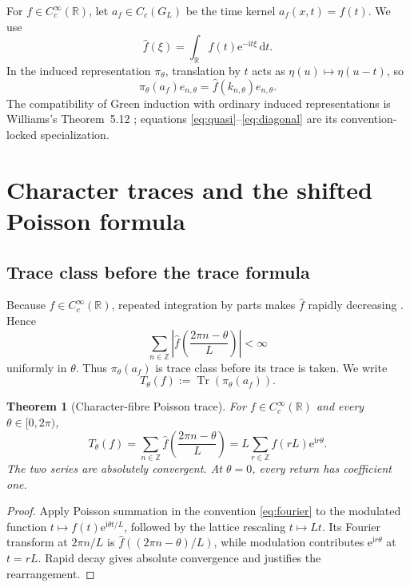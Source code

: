 \documentclass[11pt]{article}
\newtheorem{theorem}{Theorem}[section]
\theoremstyle{definition}
\newcommand{\R}{\mathbb{R}}
\newcommand{\Z}{\mathbb{Z}}
\newcommand{\dd}{\,\mathrm{d}}
\newcommand{\e}{\mathrm{e}}
\newcommand{\ii}{\mathrm{i}}
\newcommand{\Tr}{\operatorname{Tr}}
\begin{document}
For \(f\in C_c^\infty(\R)\), let \(a_f\in C_c(G_L)\) be the time kernel \(a_f(x,t)=f(t)\).  We use
\begin{equation}
 \widehat f(\xi)=\int_{\R} f(t)\e^{-\ii t\xi}\dd t.\label{eq:fourier}
\end{equation}
In the induced representation \(\pi_\theta\), translation by \(t\) acts as \(\eta(u)\mapsto\eta(u-t)\), so
\begin{equation}
 \pi_\theta(a_f)e_{n,\theta}
 =\widehat f(k_{n,\theta})e_{n,\theta}.\label{eq:diagonal}
\end{equation}
The compatibility of Green induction with ordinary induced representations is Williams's Theorem~5.12 \cite[p.~161]{Williams2007}; equations \eqref{eq:quasi}--\eqref{eq:diagonal} are its convention-locked specialization.

\section{Character traces and the shifted Poisson formula}

\subsection{Trace class before the trace formula}

Because \(f\in C_c^\infty(\R)\), repeated integration by parts makes \(\widehat f\) rapidly decreasing \cite[Theorems~14.10--14.11, pp.~84--85]{Laugesen2017}.  Hence
\[
 \sum_{n\in\Z}\left|\widehat f\left(\frac{2\pi n-\theta}{L}\right)\right|<\infty
\]
uniformly in \(\theta\).  Thus \(\pi_\theta(a_f)\) is trace class before its trace is taken.  We write
\[
 T_\theta(f):=\Tr(\pi_\theta(a_f)).
\]

\begin{theorem}[Character-fibre Poisson trace]\label{thm:poisson}
For \(f\in C_c^\infty(\R)\) and every \(\theta\in[0,2\pi)\),
\begin{equation}
 T_\theta(f)
 =\sum_{n\in\Z}\widehat f\left(\frac{2\pi n-\theta}{L}\right)
 =L\sum_{r\in\Z}f(rL)\e^{\ii r\theta}.\label{eq:poisson}
\end{equation}
The two series are absolutely convergent.  At \(\theta=0\), every return has coefficient one.
\end{theorem}

\begin{proof}
Apply Poisson summation in the convention \eqref{eq:fourier} \cite[Theorem~23.5, p.~137]{Laugesen2017} to the modulated function \(t\mapsto f(t)\e^{\ii\theta t/L}\), followed by the lattice rescaling \(t\mapsto Lt\).  Its Fourier transform at \(2\pi n/L\) is \(\widehat f((2\pi n-\theta)/L)\), while modulation contributes \(\e^{\ii r\theta}\) at \(t=rL\).  Rapid decay gives absolute convergence and justifies the rearrangement.
\end{proof}
\end{document}
